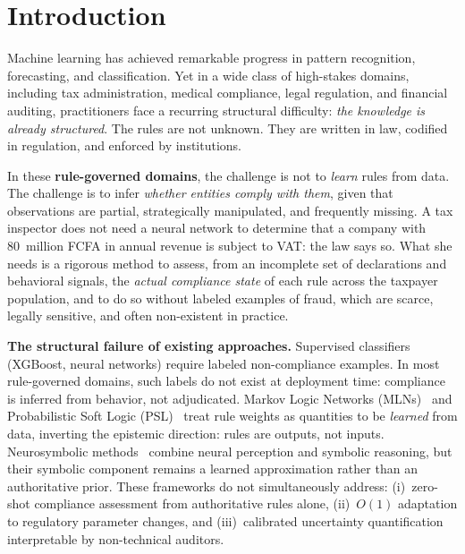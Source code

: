 \documentclass[letterpaper]{article}
\begin{document}
\newpage

\section{Introduction}
\label{sec:intro}

Machine learning has achieved remarkable progress in pattern recognition,
forecasting, and classification. Yet in a wide class of high-stakes
domains, including tax administration, medical compliance, legal
regulation, and financial auditing, practitioners face a recurring
structural difficulty: \emph{the knowledge is already structured}. The
rules are not unknown. They are written in law, codified in regulation,
and enforced by institutions.

In these \textbf{rule-governed domains}, the challenge is not to
\emph{learn} rules from data. The challenge is to infer \emph{whether
entities comply with them}, given that observations are partial,
strategically manipulated, and frequently missing. A tax inspector does
not need a neural network to determine that a company with 80~million
FCFA in annual revenue is subject to VAT: the law says so. What she
needs is a rigorous method to assess, from an incomplete set of
declarations and behavioral signals, the \emph{actual compliance state}
of each rule across the taxpayer population, and to do so without
labeled examples of fraud, which are scarce, legally sensitive, and
often non-existent in practice.

\medskip
\noindent\textbf{The structural failure of existing approaches.}
Supervised classifiers (XGBoost, neural networks) require labeled
non-compliance examples. In most rule-governed domains, such labels
do not exist at deployment time: compliance is inferred from behavior,
not adjudicated. Markov Logic Networks (MLNs)~\citep{richardson2006markov}
and Probabilistic Soft Logic (PSL)~\citep{bach2017hinge} treat rule
weights as quantities to be \emph{learned} from data, inverting the
epistemic direction: rules are outputs, not inputs. Neurosymbolic
methods~\citep{garcez2022neural} combine neural perception and symbolic
reasoning, but their symbolic component remains a learned approximation
rather than an authoritative prior. These frameworks do not
simultaneously address: (i)~zero-shot compliance assessment from
authoritative rules alone, (ii)~$O(1)$ adaptation to regulatory
parameter changes, and (iii)~calibrated uncertainty quantification
interpretable by non-technical auditors.
\end{document}
